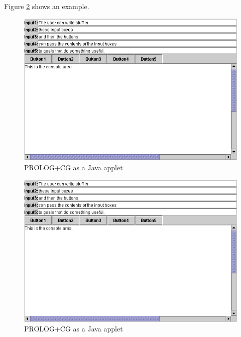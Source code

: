 \documentclass{book}
\begin{document}
Figure \ref{PPCGAsJavaApplet} shows an example.

\begin{latexonly}

\begin{figure}
\begin{center}
\includegraphics[scale=0.5]{PPCGAsJavaApplet.png}
\end{center}
\caption{\label{PPCGAsJavaApplet}PROLOG+CG as a Java applet}
\end{figure}

\end{latexonly}

\begin{htmlonly}

\begin{figure}
\begin{center}
\includegraphics{PPCGAsJavaApplet.png}
\end{center}
\caption{\label{PPCGAsJavaApplet}PROLOG+CG as a Java applet}
\end{figure}

\end{htmlonly}
\end{document}
